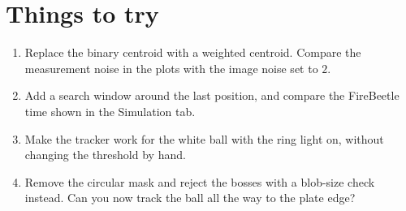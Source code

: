 \documentclass[10pt,a4paper]{article}
\begin{document}
\section{Things to try}
\begin{enumerate}
  \item Replace the binary centroid with a weighted centroid. Compare the measurement noise in the
        plots with the image noise set to $2$.
  \item Add a search window around the last position, and compare the FireBeetle time shown in
        the Simulation tab.
  \item Make the tracker work for the white ball with the ring light on, without changing the
        threshold by hand.
  \item Remove the circular mask and reject the bosses with a blob-size check instead. Can you
        now track the ball all the way to the plate edge?
\end{enumerate}



\end{document}
